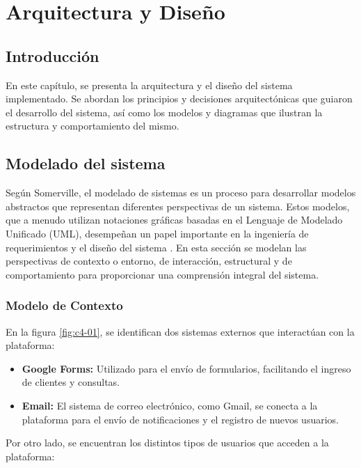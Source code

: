 \chapter{Arquitectura y Diseño}\label{cap:arquitectura-diseño}

\section{Introducción}
En este capítulo, se presenta la arquitectura y el diseño del sistema implementado. Se abordan los principios y decisiones arquitectónicas que guiaron el desarrollo del sistema, así como los modelos y diagramas que ilustran la estructura y comportamiento del mismo.


\section{Modelado del sistema}
Según Somerville, el modelado de sistemas es un proceso para desarrollar modelos abstractos que representan diferentes perspectivas de un sistema. Estos modelos, que a menudo utilizan notaciones gráficas basadas en el Lenguaje de Modelado Unificado (UML), desempeñan un papel importante en la ingeniería de requerimientos y el diseño del sistema \cite{Somerville}. 
En esta sección se modelan las perspectivas de contexto o entorno, de interacción, estructural y de comportamiento para proporcionar una comprensión integral del sistema.


\subsection{Modelo de Contexto}

En la figura \ref{fig:c4-01}, se identifican dos sistemas externos que interactúan con la plataforma:

\begin{itemize}
    \item \textbf{Google Forms:} Utilizado para el envío de formularios, facilitando el ingreso de clientes y consultas.
    \item \textbf{Email:} El sistema de correo electrónico, como Gmail, se conecta a la plataforma para el envío de notificaciones y el registro de nuevos usuarios.
\end{itemize}

Por otro lado, se encuentran los distintos tipos de usuarios que acceden a la plataforma:

